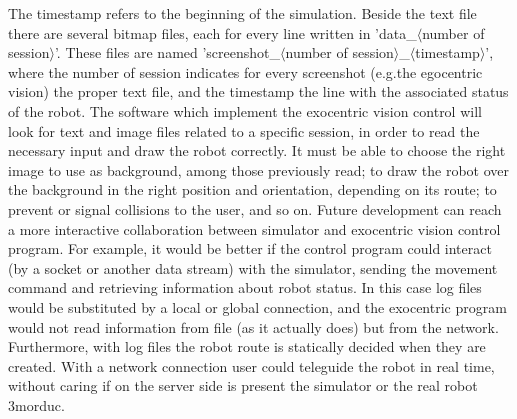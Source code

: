 \newline 
\newline The timestamp refers to the beginning of the simulation.
\newline Beside the text file there are several bitmap files, each for every line written in 'data\_$\langle$number of
session$\rangle$'. These files are named 'screenshot\_$\langle$number of session$\rangle$\_$\langle$timestamp$\rangle$', where the
number of session indicates for every screenshot (e.g.the egocentric vision) the proper text file, and the timestamp
the line with the associated status of the robot.
\newline The software which implement the exocentric vision control will look for text and image files related to a specific 
session, in order to read the necessary input and draw the robot correctly. It must be able to choose the right image to use as 
background, among those previously read; to draw the robot over the background in the right position and orientation, depending 
on its route; to prevent or signal collisions to the user, and so on.
\newline Future development can reach a more interactive collaboration between simulator and exocentric vision control program. For
example, it would be better if the control program could interact (by a socket or another data stream) with the simulator, sending
the movement command and retrieving information about robot status. In this case log files would be substituted by a local or 
global connection, and the exocentric program would not read information from file (as it actually does) but from the network.
Furthermore, with log files the robot route is statically decided when they are created. With a network connection user
could teleguide the robot in real time, without caring if on the server side is present the simulator or the real robot 3morduc.
